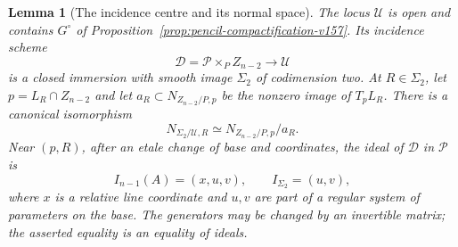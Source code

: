 \documentclass[11pt,reqno]{amsart}
\numberwithin{equation}{section}
\newtheorem{lemma}[theorem]{Lemma}
\theoremstyle{definition}\newtheorem{definition}[theorem]{Definition}
\theoremstyle{remark}\newtheorem{remark}[theorem]{Remark}
\begin{document}
\begin{lemma}[The incidence centre and its normal space]
\label{lem:incidence-centre-v160}
The locus $\mathcal U$ is open and contains $G^\circ$ of
Proposition~\ref{prop:pencil-compactification-v157}. Its incidence
scheme
\[
 \mathcal D=\mathcal P\times_P Z_{n-2}\longrightarrow\mathcal U
\]
is a closed immersion with smooth image $\Sigma_2$ of codimension two.
At $R\in\Sigma_2$, let $p=L_R\cap Z_{n-2}$ and let
$a_R\subset N_{Z_{n-2}/P,p}$ be the nonzero image of $T_pL_R$.
There is a canonical isomorphism
\begin{equation}\label{eq:incidence-normal-v160}
 N_{\Sigma_2/\mathcal U,R}
       \simeq N_{Z_{n-2}/P,p}/a_R.
\end{equation}
Near $(p,R)$, after an etale change of base and coordinates, the
ideal of $\mathcal D$ in $\mathcal P$ is
\begin{equation}\label{eq:incidence-local-v160}
       I_{n-1}(A)=(x,u,v),\qquad I_{\Sigma_2}=(u,v),
\end{equation}
where $x$ is a relative line coordinate and $u,v$ are part of a
regular system of parameters on the base. The generators may be
changed by an invertible matrix; the asserted equality is an equality
of ideals.
\end{lemma}
\end{document}
